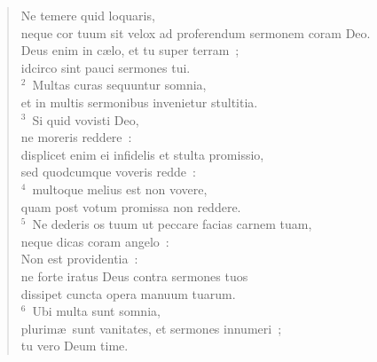 \begin{flushleft}\begin{verse}\vspace{-19pt}Ne temere quid loquaris,\\ neque cor tuum sit velox ad proferendum sermonem coram Deo.\\ Deus enim in c\ae lo, et tu super terram~;\\ idcirco sint pauci sermones tui.\\
${}^{2}$~Multas curas sequuntur somnia,\\ et in multis sermonibus invenietur stultitia.\\
${}^{3}$~Si quid vovisti Deo,\\ ne moreris reddere~:\\ displicet enim ei infidelis et stulta promissio,\\ sed quodcumque voveris redde~:\\
${}^{4}$~multoque melius est non vovere,\\ quam post votum promissa non reddere.\\
${}^{5}$~Ne dederis os tuum ut peccare facias carnem tuam,\\ neque dicas coram angelo~:\\ Non est providentia~:\\ ne forte iratus Deus contra sermones tuos\\ dissipet cuncta opera manuum tuarum.\\
${}^{6}$~Ubi multa sunt somnia,\\ plurim\ae\ sunt vanitates, et sermones innumeri~;\\ tu vero Deum time.\end{verse}\end{flushleft}


